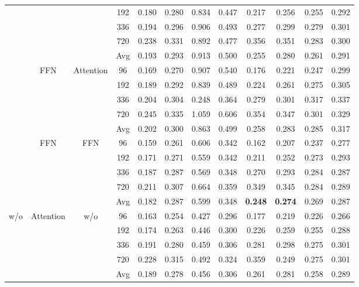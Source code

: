\documentclass{article} %
\begin{document}
\begin{table}[htbp]
\begin{small}
\begin{tabular}{c|c|c|c|cc|cc|cc|cc}
     & & & 192 & 0.180 & 0.280 & 0.834 & 0.447 & 0.217 & 0.256 & 0.255 & 0.292\\
     & & & 336 & 0.194 & 0.296 & 0.906 & 0.493 & 0.277 & 0.299 & 0.279 & 0.301\\
     & & & 720 & 0.238 & 0.331 & 0.892 & 0.477 & 0.356 & 0.351 & 0.283 & 0.300\\
     \cmidrule(lr){4-12}
     & & & Avg & 0.193 & 0.293 & 0.913 & 0.500 & 0.255 & 0.280 & 0.261 & 0.291\\
     \cmidrule(lr){2-12}
     & \multirow{5}{*}{FFN} & \multirow{5}{*}{Attention} & 96 & 0.169 & 0.270 & 0.907 & 0.540 & 0.176 & 0.221 & 0.247 & 0.299\\
     & & & 192 & 0.189 & 0.292 & 0.839 & 0.489 & 0.224 & 0.261 & 0.275 & 0.305 \\
     & & & 336 & 0.204 & 0.304 & 0.248 & 0.364 & 0.279 & 0.301 & 0.317 & 0.337\\
     & & & 720 & 0.245 & 0.335 & 1.059 & 0.606 & 0.354 & 0.347 & 0.301 & 0.329\\
     \cmidrule(lr){4-12}
     & & & Avg & 0.202 & 0.300 & 0.863 & 0.499 & 0.258 & 0.283 & 0.285 & 0.317 \\
     \cmidrule(lr){2-12}
     & \multirow{5}{*}{FFN} & \multirow{5}{*}{FFN} & 96 & 0.159 & 0.261 & 0.606 & 0.342 & 0.162 & 0.207 & 0.237 & 0.277\\
     & & & 192 & 0.171 & 0.271 & 0.559 & 0.342 & 0.211 & 0.252 & 0.273 & 0.293\\
     & & & 336 & 0.187 & 0.287 & 0.569 & 0.348 & 0.270 & 0.293 & 0.284 & 0.287\\
     & & & 720 & 0.211 & 0.307 & 0.664 & 0.359 & 0.349 & 0.345 & 0.284 & 0.289\\
     \cmidrule(lr){4-12}
     & & & Avg & 0.182 & 0.287 & 0.599 & 0.348 & \textbf{0.248} & \textbf{0.274} & 0.269 & 0.287\\
    \midrule
    \multirow{10}{*}{w/o} & \multirow{5}{*}{Attention} & \multirow{5}{*}{w/o} & 96 & 0.163 & 0.254 & 0.427 & 0.296 & 0.177 & 0.219 & 0.226 & 0.266\\
    & & & 192 & 0.174 & 0.263 & 0.446 & 0.300 & 0.226 & 0.259 & 0.255 & 0.288\\
     & & & 336 & 0.191 & 0.280 & 0.459 & 0.306 & 0.281 & 0.298 & 0.275 & 0.301\\
     & & & 720 & 0.228 & 0.315 & 0.492 & 0.324 & 0.359 & 0.249 & 0.275 & 0.301\\
     \cmidrule(lr){4-12}
     & & & Avg & 0.189 & 0.278 & 0.456 & 0.306 & 0.261 & 0.281 & 0.258 & 0.289\\
     \cmidrule(lr){2-12}
     

\end{tabular}
\end{small}
\end{table}
\end{document}

